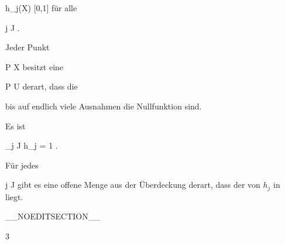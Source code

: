 {{{\mavergleichskette
{\vergleichskette
{ h_j(X)
}
{ \subseteq }{ [0,1]
}
{  }{
}
{    }{
}
{   }{
}
}
{}{}{}
für alle

\mavergleichskette
{\vergleichskette
{ j
}
{ \in }{ J
}
{  }{
}
{    }{
}
{   }{
}
}
{}{}{.}
}{Jeder Punkt

\mavergleichskette
{\vergleichskette
{ P
}
{ \in }{ X
}
{  }{
}
{    }{
}
{   }{
}
}
{}{}{}
besitzt eine

\mavergleichskette
{\vergleichskette
{ P
}
{ \in }{  U
}
{  }{
}
{    }{
}
{   }{
}
}
{}{}{}
derart, dass die

 bis auf endlich viele Ausnahmen die Nullfunktion sind.
}{Es ist

\mavergleichskette
{\vergleichskette
{  \sum_{j \in J} h_j
}
{ = }{ 1
}
{  }{
}
{    }{
}
{   }{
}
}
{}{}{.}
}{Für jedes

\mavergleichskette
{\vergleichskette
{ j
}
{ \in }{ J
}
{  }{
}
{    }{
}
{   }{
}
}
{}{}{}
gibt es eine offene Menge
 aus der Überdeckung derart, dass der
von $h_j$ in
 liegt.
}
}

 }

__NOEDITSECTION__

{3}

